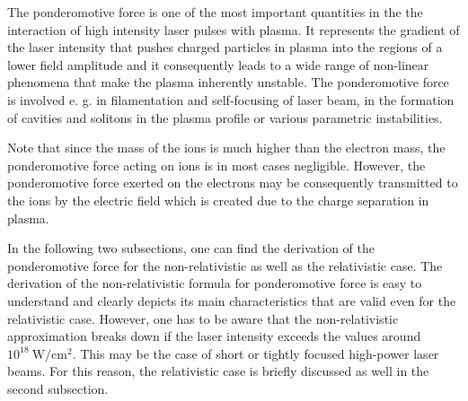 The ponderomotive force is one of the most important quantities in the the interaction of high intensity laser pulses with plasma. It represents the gradient of the laser intensity that pushes charged particles in plasma into the regions of a lower field amplitude and it consequently leads to a wide range of non-linear phenomena that make the plasma inherently unstable. The ponderomotive force is involved e. g. in filamentation and self-focusing of laser beam, in the formation of cavities and solitons in the plasma profile or various parametric instabilities.

Note that since the mass of the ions is much higher than the electron mass, the ponderomotive force acting on ions is in most cases negligible. However, the ponderomotive force exerted on the electrons may be consequently transmitted to the ions by the electric field which is created due to the charge separation in plasma.

In the following two subsections, one can find the derivation of the ponderomotive force for the non-relativistic as well as the relativistic case. The derivation of the non-relativistic formula for ponderomotive force is easy to understand and clearly depicts its main characteristics that are valid even for the relativistic case. However, one has to be aware that the non-relativistic approximation breaks down if the laser intensity exceeds the values around $ 10^{18} \ \mathrm{W/cm^2} $. This may be the case of short or tightly focused high-power laser beams. For this reason, the relativistic case is briefly discussed as well in the second subsection.